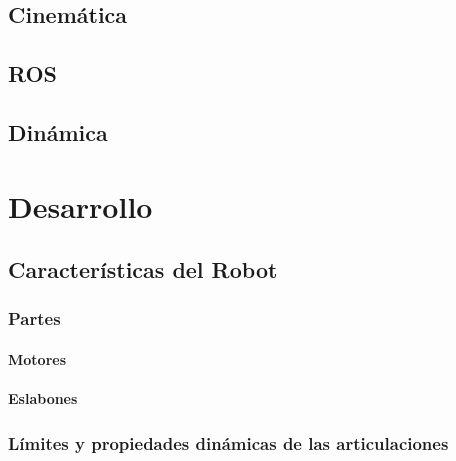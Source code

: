 \documentclass[a4paper,12pt, oneside]{book}
\begin{document}
		\section{Cinemática} \label{sec:cinematica}
		
		
		\section{ROS} \label{sec:ros}
		
		
		\section{Dinámica} \label{sec:dinamica}
		
	
	\chapter{Desarrollo} \label{chap:desarrollo}
	
	
		\section{Características del Robot} \label{sec:caracteristicas_del_robot}
		
		
			\subsection{Partes} \label{subsec:partes}
			
			
			\subsubsection{Motores} \label{subsubsec:motores}
			
			
			\subsubsection{Eslabones} \label{subsubsec:eslabones}
			
			
			\subsection{Límites y propiedades dinámicas de las articulaciones} \label{subsec:limites_propiedades}
			
		
\end{document}
